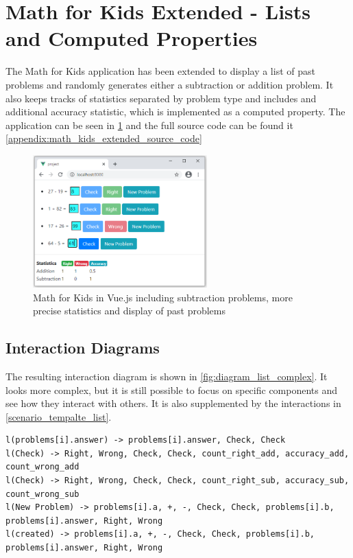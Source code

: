 \section{Math for Kids Extended - Lists and Computed Properties}
The Math for Kids application has been extended to display a list of past problems and randomly generates either a subtraction or addition problem. It also keeps tracks of statistics separated by problem type and includes and additional accuracy statistic, which is implemented as a computed property. The application can be seen in \ref{fig:eval_image_list_complex} and the full source code can be found it \ref{appendix:math_kids_extended_source_code}
\begin{figure}[H]
    \centering
    \includegraphics[width=0.6\textwidth]{images/math_for_kids_own_complex.png}
     \caption{Math for Kids in Vue.js including subtraction problems, more precise statistics and display of past problems }
     \label{fig:eval_image_list_complex}
\end{figure}

\subsection{Interaction Diagrams}
The resulting interaction diagram  is shown in \ref{fig:diagram_list_complex}. It looks more complex, but it is still possible to focus on specific components and see how they interact with others. It is also supplemented by the interactions  in \ref{scenario_tempalte_list}.

\label{scenario_tempalte_list}
\begin{lstlisting}[language=JavaScriptPlain,caption = {Interactions of the Math for Kids Extended application}, captionpos=b,basicstyle=\fontsize{8}{8}\selectfont\ttfamily]
l(problems[i].answer) -> problems[i].answer, Check, Check
l(Check) -> Right, Wrong, Check, Check, count_right_add, accuracy_add, count_wrong_add
l(Check) -> Right, Wrong, Check, Check, count_right_sub, accuracy_sub, count_wrong_sub
l(New Problem) -> problems[i].a, +, -, Check, Check, problems[i].b, problems[i].answer, Right, Wrong
l(created) -> problems[i].a, +, -, Check, Check, problems[i].b, problems[i].answer, Right, Wrong
\end{lstlisting}
